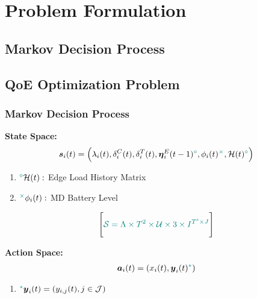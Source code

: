 \section{Problem Formulation}
\subsection{Markov Decision Process}
\subsection{QoE Optimization Problem}


\begin{frame}
	\frametitle{Markov Decision Process}
	
	
	\textbf{State Space:}
	\begin{alignat}{2}
		\boldsymbol{s}_i(t) = \Big(\lambda_i(t), \delta_i^{C}(t), \delta_i^{T}(t), \boldsymbol{\eta}_i^{E}(t-1)\textcolor{teal}{^\circ},\phi_i(t)\textcolor{teal}{^\times}, \mathcal{H}(t)\textcolor{teal}{^\diamond} \Big)
		\label{18}
	\end{alignat}

	\begin{enumerate}[]
		
		\vspace{2mm}
		
		\item  \hspace{0mm} $\textcolor{teal}{^\diamond}\mathcal{H}(t):$ Edge Load History Matrix \vspace{2mm} 
		
				\vspace{2mm}
		\item  \hspace{0mm}  $\textcolor{teal}{^\times} \phi_i(t):$  MD Battery Level
	
	\end{enumerate}
$$\Bigg[\textcolor{teal}{\mathcal{S} =  \Lambda \times T^2 \times \mathcal{U} \times 3 \times I^{T^{\text{s}} \times J}}\Bigg]$$


	\textbf{Action Space:}
	\begin{alignat}{2}
		\boldsymbol{a}_i(t) = (x_i(t), \boldsymbol{y}_i(t)\textcolor{teal}{^*})
		\label{20}
	\end{alignat}

	\begin{enumerate}[]
	
	\item  \hspace{0mm} $\textcolor{teal}{^*} \boldsymbol{y}_i(t) = (y_{i,j}(t), j \in \mathcal{J})$
\end{enumerate}

\end{frame}

